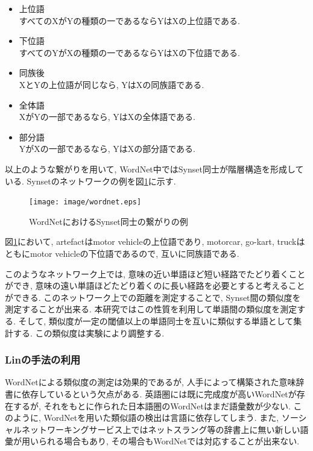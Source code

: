 \documentclass[12pt]{jarticle}
\begin{document}
\begin{itemize}
\item 上位語 \\
すべてのXがYの種類の一であるならYはXの上位語である. 
\item 下位語 \\
すべてのYがXの種類の一であるならYはXの下位語である. 
\item 同族後 \\
XとYの上位語が同じなら, YはXの同族語である. 
\item 全体語\\
XがYの一部であるなら, YはXの全体語である. 
\item 部分語 \\
YがXの一部であるなら, YはXの部分語である. 
\end{itemize}

以上のような繋がりを用いて, WordNet中ではSynset同士が階層構造を形成している. 
Synsetのネットワークの例を図\ref{word_net}に示す. 

\begin{figure}[htbp]
  \begin{center}
    \texttt{[image: image/wordnet.eps]}
  \end{center}
  \caption{WordNetにおけるSynset同士の繋がりの例}
  \label{word_net}
\end{figure}

図\ref{word_net}において, artefactはmotor vehicleの上位語であり, motorcar, go-kart, truckはともにmotor vehicleの下位語であるので, 互いに同族語である. 

このようなネットワーク上では, 意味の近い単語ほど短い経路でたどり着くことができ, 意味の遠い単語ほどたどり着くのに長い経路を必要とすると考えることができる. このネットワーク上での距離を測定することで, Synset間の類似度を測定することが出来る\cite{wordnet-similarity}. 本研究ではこの性質を利用して単語間の類似度を測定する. そして, 類似度が一定の閾値以上の単語同士を互いに類似する単語として集計する. この類似度は実験により調整する. 

\subsubsection{Linの手法の利用}
WordNetによる類似度の測定は効果的であるが, 人手によって構築された意味辞書に依存しているという欠点がある. 英語圏には既に完成度が高いWordNetが存在するが, それをもとに作られた日本語圏のWordNetはまだ語彙数が少ない. このように, WordNetを用いた類似語の検出は言語に依存してしまう. また, ソーシャルネットワーキングサービス上ではネットスラング等の辞書上に無い新しい語彙が用いられる場合もあり, その場合もWordNetでは対応することが出来ない. 
\end{document}
